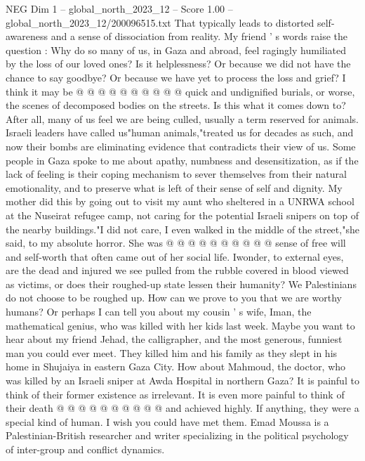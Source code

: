 \begin{textsample}{NEG Dim 1 – global\_north\_2023\_12 – Score 1.00 – global\_north\_2023\_12/200096515.txt}
That typically leads to distorted self-awareness and a sense of dissociation from reality.
My friend ' s words raise the question : Why do so many of us, in Gaza and abroad, feel ragingly humiliated by the loss of our loved ones?
Is it helplessness?
Or because we did not have the chance to say goodbye?
Or because we have yet to process the loss and grief?
I think it may be @ @ @ @ @ @ @ @ @ @ quick and undignified burials, or worse, the scenes of decomposed bodies on the streets.
Is this what it comes down to?
After all, many of us feel we are being culled, usually a term reserved for animals.
Israeli leaders have called us"human animals,"treated us for decades as such, and now their bombs are eliminating evidence that contradicts their view of us.
Some people in Gaza spoke to me about apathy, numbness and desensitization, as if the lack of feeling is their coping mechanism to sever themselves from their natural emotionality, and to preserve what is left of their sense of self and dignity.
My mother did this by going out to visit my aunt who sheltered in a UNRWA school at the Nuseirat refugee camp, not caring for the potential Israeli snipers on top of the nearby buildings."I did not care, I even walked in the middle of the street,"she said, to my absolute horror.
She was @ @ @ @ @ @ @ @ @ @ sense of free will and self-worth that often came out of her social life.
Iwonder, to external eyes, are the dead and injured we see pulled from the rubble covered in blood viewed as victims, or does their roughed-up state lessen their humanity?
We Palestinians do not choose to be roughed up.
How can we prove to you that we are worthy humans?
Or perhaps I can tell you about my cousin ' s wife, Iman, the mathematical genius, who was killed with her kids last week.
Maybe you want to hear about my friend Jehad, the calligrapher, and the most generous, funniest man you could ever meet.
They killed him and his family as they slept in his home in Shujaiya in eastern Gaza City.
How about Mahmoud, the doctor, who was killed by an Israeli sniper at Awda Hospital in northern Gaza?
It is painful to think of their former existence as irrelevant.
It is even more painful to think of their death @ @ @ @ @ @ @ @ @ @ and achieved highly.
If anything, they were a special kind of human.
I wish you could have met them.
Emad Moussa is a Palestinian-British researcher and writer specializing in the political psychology of inter-group and conflict dynamics.

\end{textsample}
